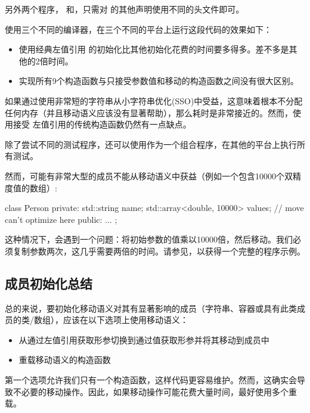 另外两个程序， 和，只需对  的其他声明使用不同的头文件即可。

使用三个不同的编译器，在三个不同的平台上运行这段代码的效果如下：

\begin{itemize}
	\item 使用经典左值引用 的初始化比其他初始化花费的时间要多得多。差不多是其他的2倍时间。
	\item 实现所有9个构造函数与只接受参数值和移动的构造函数之间没有很大区别。
\end{itemize}

如果通过使用非常短的字符串从小字符串优化(SSO)中受益，这意味着根本不分配任何内存（并且移动语义应该没有显著帮助），那么耗时是非常接近的。然而，使用接受  左值引用的传统构造函数仍然有一点缺点。

除了尝试不同的测试程序，还可以使用作为一个组合程序，在其他的平台上执行所有测试。

然而，可能有非常大型的成员不能从移动语义中获益（例如一个包含10000个双精度值的数组）:

\begin{cppcode}
class Person {
private:
	std::string name;
	std::array<double, 10000> values; // move can’t optimize here
public:
	...
};
\end{cppcode}

这种情况下，会遇到一个问题：将初始参数的值乘以10000倍，然后移动。我们必须复制参数两次，这几乎需要两倍的时间。请参见，以获得一个完整的程序示例。

\subsection{成员初始化总结}

总的来说，要初始化移动语义对其有显著影响的成员（字符串、容器或具有此类成员的类/数组），应该在以下选项上使用移动语义：

\begin{itemize}
	\item 从通过左值引用获取形参切换到通过值获取形参并将其移动到成员中
	\item 重载移动语义的构造函数
\end{itemize}

第一个选项允许我们只有一个构造函数，这样代码更容易维护。然而，这确实会导致不必要的移动操作。因此，如果移动操作可能花费大量时间，最好使用多个重载。

